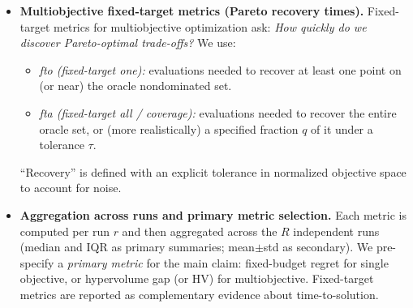 \begin{itemize}
    \item \textbf{Multiobjective fixed-target metrics (Pareto recovery times).}
    Fixed-target metrics for multiobjective optimization ask: \emph{How quickly do we discover Pareto-optimal trade-offs?}
    We use:
    \begin{itemize}
        \item \emph{fto (fixed-target one):} evaluations needed to recover at least one point on (or near) the oracle nondominated set.
        \item \emph{fta (fixed-target all / coverage):} evaluations needed to recover the entire oracle set, or (more realistically)
        a specified fraction \(q\) of it under a tolerance \(\tau\).
    \end{itemize}
    ``Recovery'' is defined with an explicit tolerance in normalized objective space to account for noise.

    \item \textbf{Aggregation across runs and primary metric selection.}
    Each metric is computed per run \(r\) and then aggregated across the \(R\) independent runs
    (median and IQR as primary summaries; mean$\pm$std as secondary).
    We pre-specify a \emph{primary metric} for the main claim:
    fixed-budget regret for single objective, or hypervolume gap (or HV) for multiobjective.
    Fixed-target metrics are reported as complementary evidence about time-to-solution.
\end{itemize}
